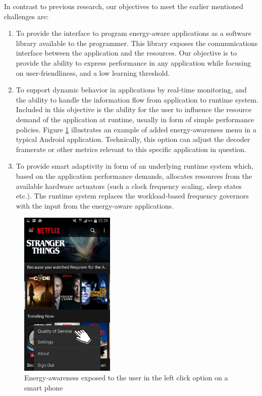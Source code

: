 \documentclass{article}
\begin{document}
In contrast to previous research, our objectives to meet the earlier mentioned challenges are:
\begin{enumerate}
 \item To provide the interface to program energy-aware applications as a software library available to the programmer. 
 This library exposes the communications interface between the application and the resources. 
 Our objective is to provide the ability to express performance in any application while focusing on user-friendliness, and a low learning threshold.
 \item To support dynamic behavior in applications by real-time monitoring, and the ability to handle the information flow from application to runtime system.
  Included in this objective is the ability for the user to influence the resource demand of the application at runtime, usually in form of simple performance policies.
  Figure \ref{fig:netflix} illustrates an example of added energy-awareness menu in a typical Android application.
  Technically, this option can adjust the decoder framerate or other metrics relevant to this specific application in question.
 \item To provide smart adaptivity in form of an underlying runtime system which, based on the application performance demands, allocates resources from the available hardware actuators (such a clock frequency scaling, sleep states etc.).
  The runtime system replaces the workload-based frequency governors with the input from the energy-aware applications.
\end{enumerate}
\begin{figure}
  \begin{center}
    \vspace{-0.8cm}
    \includegraphics[width=4.5cm]{fig/netflix.png}
  \end{center}
  \caption{Energy-awareness exposed to the user in the left click option on a smart phone}
  \label{fig:netflix}
  \vspace{-1.3cm}
\end{figure}
\end{document}
